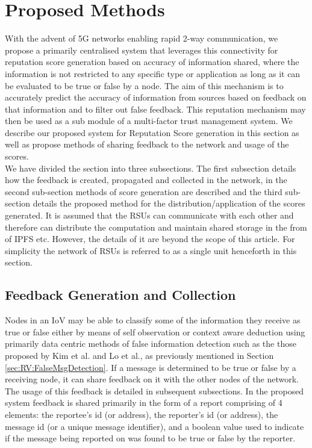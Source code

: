 \documentclass[journal]{IEEEtran}
\begin{document}
\section{Proposed Methods}
\label{sec:PM}
With the advent of 5G networks enabling rapid 2-way communication, we propose a primarily centralised system that leverages this connectivity for reputation score generation based on accuracy of information shared, where the information is not restricted to any specific type or application as long as it can be evaluated to be true or false by a node. The aim of this mechanism is to accurately predict the accuracy of information from sources based on feedback on that information and to filter out false feedback. This reputation mechanism may then be used as a sub module of a multi-factor trust management system.
We describe our proposed system for Reputation Score generation in this section as well as propose methods of sharing feedback to the network and usage of the scores. \\ We have divided the section into three subsections. The first subsection details how the feedback is created, propagated and collected in the network, in the second sub-section methods of score generation are described and the third sub-section details the proposed method for the distribution/application of the scores generated. It is assumed that the RSUs can communicate with each other and therefore can distribute the computation and maintain shared storage in the from of IPFS etc.
However, the details of it are beyond the scope of this article. For simplicity the network of RSUs is referred to as a single unit henceforth in this section.
\subsection{Feedback Generation and Collection}
\label{sec:PM:FeedbackGen&Collect}
Nodes in an IoV may be able to classify some of the information they receive as true or false either by means of self observation or context aware deduction using primarily data centric methods of false information detection such as the those proposed by Kim et al.\cite{c:messagefilterCoE} and Lo et al.\cite{c:IllusionAttack}, as previously mentioned in Section \ref{sec:RV:FalseMsgDetection}. If a message is determined to be true or false by a receiving node, it can share feedback on it with the other nodes of the network. The usage of this feedback is detailed in subsequent subsections. In the proposed system feedback is shared primarily in the form of a report comprising of 4 elements: the reportee's id (or address), the reporter's id (or address), the message id (or a unique message identifier), and a boolean value used to indicate if the message being reported on was found to be true or false by the reporter. 
\end{document}
